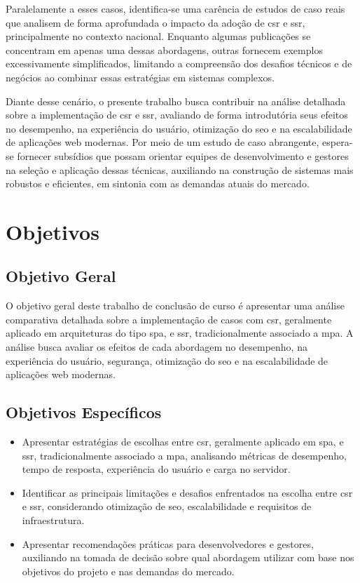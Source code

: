 Paralelamente a esses casos, identifica-se uma carência de estudos de caso reais que analisem de forma aprofundada o impacto da adoção de \acrshort{csr} e \acrshort{ssr}, principalmente no contexto nacional. Enquanto algumas publicações se concentram em apenas uma dessas abordagens, outras fornecem exemplos excessivamente simplificados, limitando a compreensão dos desafios técnicos e de negócios ao combinar essas estratégias em sistemas complexos.

Diante desse cenário, o presente trabalho busca contribuir na análise detalhada sobre a implementação de \acrshort{csr} e \acrshort{ssr}, avaliando de forma introdutória seus efeitos no desempenho, na experiência do usuário, otimização do \acrshort{seo} e na escalabilidade de aplicações web modernas. Por meio de um estudo de caso abrangente, espera-se fornecer subsídios que possam orientar equipes de desenvolvimento e gestores na seleção e aplicação dessas técnicas, auxiliando na construção de sistemas mais robustos e eficientes, em sintonia com as demandas atuais do mercado.

\section{Objetivos}

\subsection{Objetivo Geral}

O objetivo geral deste trabalho de conclusão de curso é apresentar uma análise comparativa detalhada sobre a implementação de casos com \acrfull{csr}, geralmente aplicado em arquiteturas do tipo \acrfull{spa}, e \acrfull{ssr}, tradicionalmente associado a \acrfull{mpa}. A análise busca avaliar os efeitos de cada abordagem no desempenho, na experiência do usuário, segurança, otimização do \acrfull{seo} e na escalabilidade de aplicações web modernas.

\subsection{Objetivos Específicos}
\begin{itemize}
\item Apresentar estratégias de escolhas entre \acrshort{csr}, geralmente aplicado em \acrshort{spa}, e \acrshort{ssr}, tradicionalmente associado a \acrshort{mpa}, analisando métricas de desempenho, tempo de resposta, experiência do usuário e carga no servidor.

\item Identificar as principais limitações e desafios enfrentados na escolha entre \acrshort{csr} e \acrshort{ssr}, considerando otimização de \acrshort{seo}, escalabilidade e requisitos de infraestrutura.

\item Apresentar recomendações práticas para desenvolvedores e gestores, auxiliando na tomada de decisão sobre qual abordagem utilizar com base nos objetivos do projeto e nas demandas do mercado.
\end{itemize}

